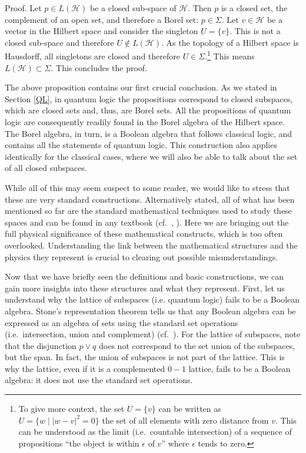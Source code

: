 \documentclass[11pt, executivepaper]{article}
\begin{document}
Proof. Let $p \in L(\mathcal{H})$ be a closed sub-space of $\mathcal{H}$. Then $p$ is a closed set, the complement of an open set, and therefore a Borel set: $p \in \Sigma$. Let $v \in \mathcal{H}$ be a vector in the Hilbert space and consider the singleton $U = \{ v \}$. This is not a closed sub-space and therefore $U \notin L(\mathcal{H})$. As the topology of a Hilbert space is Hausdorff, all singletons are closed and therefore $U \in \Sigma$.\footnote{To give more context, the set $U = \{ v \}$ can be written as $U = \{w \; | \; |w - v|^2 = 0\}$ the set of all elements with zero distance from $v$. This can be understood as the limit (i.e.\ countable intersection) of a sequence of propositions ``the object is within $\epsilon$ of $v$'' where $\epsilon$ tends to zero.} This means $L(\mathcal{H}) \subset \Sigma$. This concludes the proof.

The above proposition contains our first crucial conclusion. As we stated in Section \ref{QL}, in quantum logic the propositions correspond to closed subspaces, which are closed sets and, thus, are Borel sets. All the propositions of quantum logic are consequently readily found in the Borel algebra of the Hilbert space. The Borel algebra, in turn, is a Boolean algebra that follows classical logic, and contains all the statements of quantum logic. This construction also applies identically for the classical cases, where we will also be able to talk about the set of all closed subspaces.

While all of this may seem suspect to some reader, we would like to stress that these are very standard constructions. Alternatively stated, all of what has been mentioned so far are the standard mathematical techniques used to study these spaces and can be found in any textbook (cf.\ \cite{Rudin:1991}, \cite{Vasudeva:2017}). Here we are bringing out the full physical significance of these mathematical constructs, which is too often overlooked. Understanding the link between the mathematical structures and the physics they represent is crucial to clearing out possible misunderstandings.

Now that we have briefly seen the definitions and basic constructions, we can gain more insights into these structures and what they represent. First, let us understand why the lattice of subspaces (i.e. quantum logic) fails to be a Boolean algebra. Stone's representation theorem tells us that any Boolean algebra can be expressed as an algebra of sets using the standard set operations (i.e.\ intersection, union and complement) (cf.\ \cite{Davey:2002}). For the lattice of subspaces, note that the disjunction $p \vee q$ does not correspond to the set union of the subspaces, but the span. In fact, the union of subspaces is not part of the lattice.  This is why the lattice, even if it is a complemented $0-1$ lattice, fails to be a Boolean algebra: it does not use the standard set operations.
\end{document}
